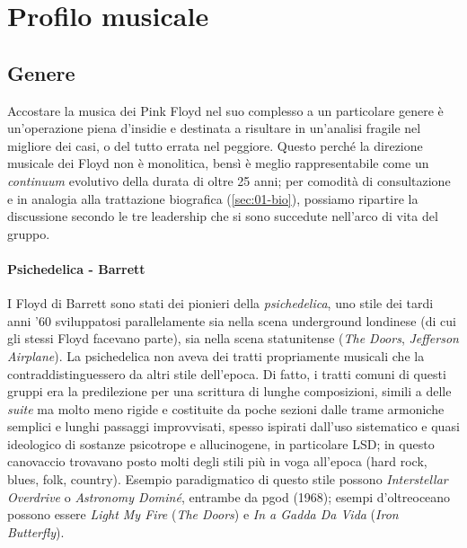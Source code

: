 \documentclass[class=book, crop=false, oneside, 12pt]{standalone}
\begin{document}
    \section{Profilo musicale}\label{sec:01-musicianship}
    
    \subsection{Genere}
    Accostare la musica dei Pink Floyd nel suo complesso a un particolare genere è un'operazione piena d'insidie e destinata a risultare in un'analisi fragile nel migliore dei casi, o del tutto errata nel peggiore. Questo perché la direzione musicale dei Floyd non è monolitica, bensì è meglio rappresentabile come un \emph{continuum} evolutivo della durata di oltre 25 anni; per comodità di consultazione e in analogia alla trattazione biografica (\ref{sec:01-bio}), possiamo ripartire la discussione secondo le tre leadership che si sono succedute nell'arco di vita del gruppo.

    \paragraph{Psichedelica - Barrett}
    I Floyd di Barrett sono stati dei pionieri della \emph{psichedelica}, uno stile dei tardi anni '60 sviluppatosi parallelamente sia nella scena underground londinese (di cui gli stessi Floyd facevano parte), sia nella scena statunitense (\emph{The Doors}, \emph{Jefferson Airplane}). La psichedelica non aveva dei tratti propriamente musicali che la contraddistinguessero da altri stile dell'epoca. Di fatto, i tratti comuni di questi gruppi era la predilezione per una scrittura di lunghe composizioni, simili a delle \emph{suite} ma molto meno rigide e costituite da poche sezioni dalle trame armoniche semplici e lunghi passaggi improvvisati, spesso ispirati dall'uso sistematico e quasi ideologico di sostanze psicotrope e allucinogene, in particolare LSD; in questo canovaccio trovavano posto molti degli stili più in voga all'epoca (hard rock, blues, folk, country). Esempio paradigmatico di questo stile possono \emph{Interstellar Overdrive} o \emph{Astronomy Dominé}, entrambe da \acrshort{pgod} (1968); esempi d'oltreoceano possono essere \emph{Light My Fire} (\emph{The Doors}) e \emph{In a Gadda Da Vida} (\emph{Iron Butterfly}).
\end{document}
